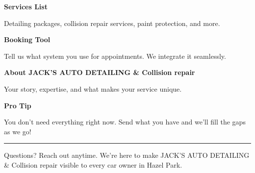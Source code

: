 \documentclass[11pt,letterpaper]{article}
\begin{document}
\hfill
\begin{minipage}[t]{0.48\textwidth}
\begin{tcolorbox}[colframe=accent-teal, boxrule=1pt, left=0.7em, right=0.7em, top=0.5em, bottom=0.5em, arc=4pt, boxsep=0pt]
{\bfseries\small\color{accent-teal}Services List}

\vspace{0.15em}

{\small Detailing packages, collision repair services, paint protection, and more.}
\end{tcolorbox}

\vspace{0.1em}

\begin{tcolorbox}[colframe=accent-teal, boxrule=1pt, left=0.7em, right=0.7em, top=0.5em, bottom=0.5em, arc=4pt, boxsep=0pt]
{\bfseries\small\color{accent-teal}Booking Tool}

\vspace{0.15em}

{\small Tell us what system you use for appointments. We integrate it seamlessly.}
\end{tcolorbox}

\vspace{0.1em}

\begin{tcolorbox}[colframe=accent-teal, boxrule=1pt, left=0.7em, right=0.7em, top=0.5em, bottom=0.5em, arc=4pt, boxsep=0pt]
{\bfseries\small\color{accent-teal}About JACK'S AUTO DETAILING \& Collision repair}

\vspace{0.15em}

{\small Your story, expertise, and what makes your service unique.}
\end{tcolorbox}

\vspace{-0.2em}
\end{minipage}

\vspace{0.15em}

\begin{tcolorbox}[colback={accent-red!5}, colframe=accent-red!20, boxrule=0.5pt, left=0.7em, right=0.7em, top=0.4em, bottom=0.4em, arc=6pt, boxsep=0pt]

{\bfseries\small\color{accent-red}Pro Tip}

\vspace{0.1em}

{\small You don't need everything right now. Send what you have and we'll fill the gaps as we go!}

\end{tcolorbox}

\vspace{0.15em}

\noindent\hrule
\vspace{0.2em}

{\small\color{text-light}Questions? Reach out anytime. We're here to make JACK'S AUTO DETAILING \& Collision repair visible to every car owner in Hazel Park.}
\end{document}
